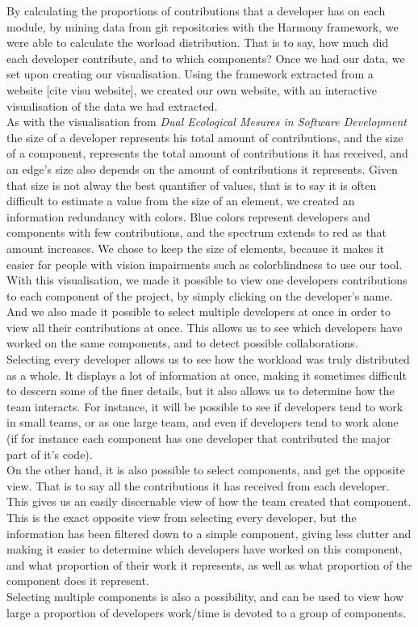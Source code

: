 By calculating the proportions of contributions that a developer has on each module, by mining data from git repositories with the Harmony\cite{Harmony} framework, we were able to calculate the worload distribution. That is to say, how much did each developer contribute, and to which components?
Once we had our data, we set upon creating our visualisation. Using the framework extracted from a website [cite visu website], we created our own website, with an interactive visualisation\cite{peoplemovin} of the data we had extracted.\\[0.3cm]
As with the visualisation from \emph{Dual Ecological Mesures in Software Development}\cite{Posnett} the size of a developer represents his total amount of contributions, and the size of a component, represents the total amount of contributions it has received, and an edge's size also depends on the amount of contributions it represents.
Given that size is not alway the best quantifier of values, that is to say it is often difficult to estimate a value from the size of an element, we created an information redundancy with colors. Blue colors represent developers and components with few contributions, and the spectrum extends to red as that amount increases.
We chose to keep the size of elements, because it makes it easier for people with vision impairments such as colorblindness to use our tool.
With this visualisation, we made it possible to view one developers contributions to each component of the project, by simply clicking on the developer's name. And we also made it possible to select multiple developers at once in order to view all their contributions at once. This allows us to see which developers have worked on the same components, and to detect possible collaborations.\\
Selecting every developer allows us to see how the workload was truly distributed as a whole. It displays a lot of information at once, making it sometimes difficult to descern some of the finer details, but it also allows us to determine how the team interacts.
For instance, it will be possible to see if developers tend to work in small teams, or as one large team, and even if developers tend to work alone (if for instance each component has one developer that contributed the major part of it's code).\\[0.3cm]

On the other hand, it is also possible to select components, and get the opposite view. That is to say all the contributions it has received from each developer. This gives us an easily discernable view of how the team created that component.  This is the exact opposite view from selecting every developer, but the information has been filtered down to a simple component, giving less clutter and making it easier to determine which developers have worked on this component, and what proportion of their work it represents, as well as what proportion of the component does it represent.\\
Selecting multiple components is also a possibility, and can be used to view how large a proportion of developers work/time is devoted to a group of components.\\[0.3cm]

